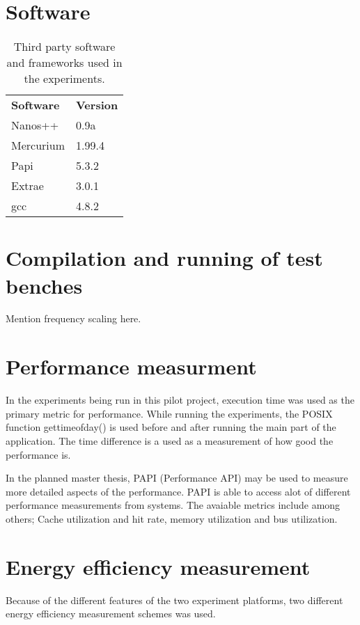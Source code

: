
\section{Software}
\begin{table}[H]
  \begin{tabular}{ll}
    \textbf{Software} & \textbf{Version}  \\
    Nanos++           & 0.9a              \\
    Mercurium         & 1.99.4            \\
    Papi              & 5.3.2             \\
    Extrae            & 3.0.1             \\
    gcc               & 4.8.2             
  \end{tabular}
  \caption{Third party software and frameworks used in the experiments.\label{overflow}}
\end{table}


\section{Compilation and running of test benches}
Mention frequency scaling here.

\section{Performance measurment}
In the experiments being run in this pilot project, execution time was used as the primary metric for performance.
While running the experiments, the POSIX function gettimeofday() is used before and after running the main part of the application.
The time difference is a used as a measurement of how good the performance is.

In the planned master thesis, PAPI (Performance API) may be used to measure more detailed aspects of the performance.
PAPI is able to access alot of different performance measurements from systems.
The avaiable metrics include among others; Cache utilization and hit rate, memory utilization and bus utilization.

\section{Energy efficiency measurement}
Because of the different features of the two experiment platforms, two different energy efficiency measurement schemes was used.

